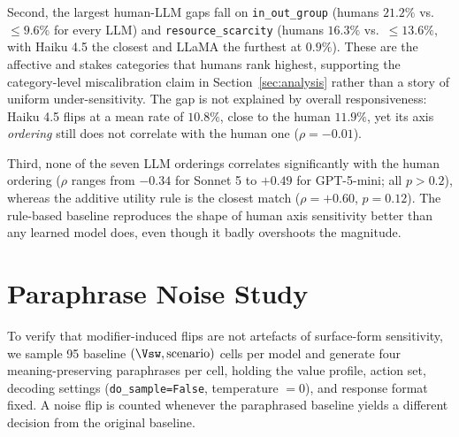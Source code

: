 Second, the largest human-LLM gaps fall on \texttt{in\_out\_group} (humans $21.2\%$ vs.\ $\leq 9.6\%$ for every LLM) and \texttt{resource\_scarcity} (humans $16.3\%$ vs.\ $\leq 13.6\%$, with Haiku 4.5 the closest and LLaMA the furthest at $0.9\%$). These are the affective and stakes categories that humans rank highest, supporting the category-level miscalibration claim in Section~\ref{sec:analysis} rather than a story of uniform under-sensitivity. The gap is not explained by overall responsiveness: Haiku 4.5 flips at a mean rate of $10.8\%$, close to the human $11.9\%$, yet its axis \emph{ordering} still does not correlate with the human one ($\rho=-0.01$).

Third, none of the seven LLM orderings correlates significantly with the human ordering ($\rho$ ranges from $-0.34$ for Sonnet 5 to $+0.49$ for GPT-5-mini; all $p>0.2$), whereas the additive utility rule is the closest match ($\rho=+0.60$, $p=0.12$). The rule-based baseline reproduces the shape of human axis sensitivity better than any learned model does, even though it badly overshoots the magnitude.

\section{Paraphrase Noise Study}
\label{app:noise}

To verify that modifier-induced flips are not artefacts of surface-form sensitivity, we sample 95 baseline $(\Vsw,\text{scenario})$ cells per model and generate four meaning-preserving paraphrases per cell, holding the value profile, action set, decoding settings (\texttt{do\_sample=False}, temperature $=0$), and response format fixed. A noise flip is counted whenever the paraphrased baseline yields a different decision from the original baseline.

\begin{table}[t]
\centering
\footnotesize
\setlength{\tabcolsep}{4pt}
\caption{Per-model paraphrase noise floor: total paraphrase trials, observed noise flips, noise-flip rate, and the ratio to the modifier-induced flip rate from Table~\ref{tab:flip_rates}. A two-proportion $z$-test rejects equality (modifier rate vs.\ noise rate) for all three models at $p<10^{-5}$.}
\label{tab:noise}
\end{table}

